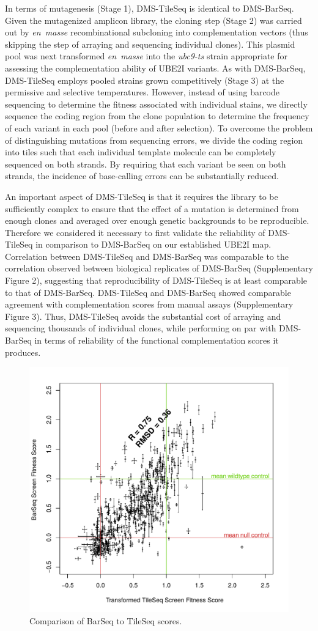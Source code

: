 In terms of mutagenesis (Stage 1), DMS-TileSeq is identical to DMS-BarSeq.  Given the mutagenized amplicon library, the cloning step (Stage 2) was carried out by \textit{en~masse} recombinational subcloning into complementation vectors (thus skipping the step of arraying and sequencing individual clones).  This plasmid pool was next transformed \textit{en~masse} into the \textit{ubc9-ts} strain appropriate for assessing the complementation ability of UBE2I variants. As with DMS-BarSeq, DMS-TileSeq employs pooled strains grown competitively (Stage 3) at the permissive and selective temperatures. However, instead of using barcode sequencing to determine the fitness associated with individual stains, we directly sequence the coding region from the clone population to determine the frequency of each variant in each pool (before and after selection). To overcome the problem of distinguishing mutations from sequencing errors, we divide the coding region into tiles such that each individual template molecule can be completely sequenced on both strands.  By requiring that each variant be seen on both strands, the incidence of base-calling errors can be substantially reduced. %

An important aspect of DMS-TileSeq is that it requires the library to be sufficiently complex to ensure that the effect of a mutation is determined from enough clones and averaged over enough genetic backgrounds to be reproducible. Therefore we considered it necessary to first validate the reliability of DMS-TileSeq in comparison to DMS-BarSeq on our established UBE2I map. Correlation between DMS-TileSeq and DMS-BarSeq was comparable to the correlation observed between biological replicates of DMS-BarSeq (Supplementary Figure 2), suggesting that reproducibility of DMS-TileSeq is at least comparable to that of DMS-BarSeq. DMS-TileSeq and DMS-BarSeq showed comparable agreement with complementation scores from manual assays (Supplementary Figure 3).  Thus, DMS-TileSeq avoids the substantial cost of arraying and sequencing thousands of individual clones, while performing on par with DMS-BarSeq in terms of reliability of the functional complementation scores it produces.

\begin{figure}[h!]
	\centering
	\includegraphics[width=.7\textwidth]{img/barVtile.pdf}
	\caption{Comparison of BarSeq to TileSeq scores. }
	\label{fig:barVtile}
\end{figure}

